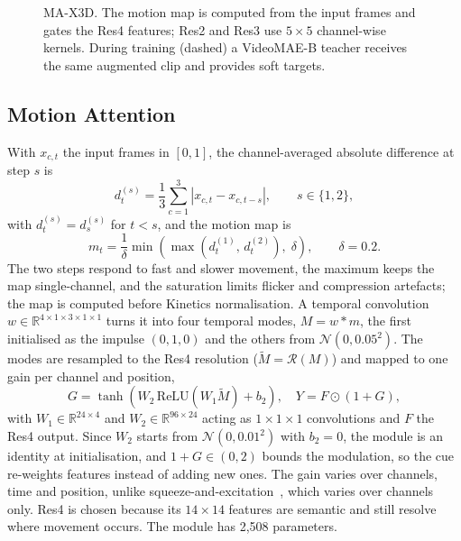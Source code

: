 \documentclass[conference]{IEEEtran}
\begin{document}
\begin{figure}[t]
  \centering
  \caption{MA-X3D. The motion map is computed from the input frames and
  gates the Res4 features; Res2 and Res3 use $5\times5$ channel-wise
  kernels. During training (dashed) a VideoMAE-B teacher receives the same
  augmented clip and provides soft targets.}
  \label{fig:pipeline}
\end{figure}

\subsection{Motion Attention}
\label{sec:ma}

With $x_{c,t}$ the input frames in $[0,1]$, the channel-averaged absolute
difference at step $s$ is
\begin{equation}
  d^{(s)}_t = \frac{1}{3} \sum_{c=1}^{3} \left| x_{c,t} - x_{c,t-s} \right|,
  \qquad s \in \{1, 2\},
  \label{eq:diff}
\end{equation}
with $d^{(s)}_t = d^{(s)}_s$ for $t < s$, and the motion map is
\begin{equation}
  m_t = \frac{1}{\delta}\min\!\left( \max\!\left(d^{(1)}_t,\, d^{(2)}_t\right),\; \delta \right),
  \qquad \delta = 0.2 .
  \label{eq:motion}
\end{equation}
The two steps respond to fast and slower movement, the maximum keeps the
map single-channel, and the saturation limits flicker and compression
artefacts; the map is computed before Kinetics normalisation. A temporal
convolution $w \in \mathbb{R}^{4 \times 1 \times 3 \times 1 \times 1}$
turns it into four temporal modes, $M = w * m$, the first initialised as
the impulse $(0,1,0)$ and the others from $\mathcal{N}(0, 0.05^2)$. The
modes are resampled to the Res4 resolution ($\tilde{M} = \mathcal{R}(M)$)
and mapped to one gain per channel and position,
\begin{equation}
  G = \tanh\!\left( W_2\, \mathrm{ReLU}\!\left(W_1 \tilde{M}\right) + b_2 \right),
  \quad Y = F \odot (1 + G),
  \label{eq:gate}
\end{equation}
with $W_1 \in \mathbb{R}^{24 \times 4}$ and $W_2 \in \mathbb{R}^{96 \times
24}$ acting as $1\times1\times1$ convolutions and $F$ the Res4 output.
Since $W_2$ starts from $\mathcal{N}(0, 0.01^2)$ with $b_2 = 0$, the module
is an identity at initialisation, and $1+G \in (0,2)$ bounds the
modulation, so the cue re-weights features instead of adding new ones. The
gain varies over channels, time and position, unlike
squeeze-and-excitation~\cite{se}, which varies over channels only. Res4 is
chosen because its $14\times14$ features are semantic and still resolve
where movement occurs. The module has 2{,}508 parameters.
\end{document}
